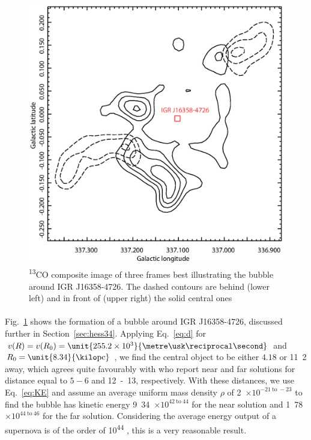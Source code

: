 \documentclass[a4paper, titlepage, oneside]{article}
\newcommand{\elem}[2]{\textsuperscript{#1}{#2}}
\newcommand{\e}[1]{\ensuremath{\times 10^{#1}}}
\newcommand{\parsec}{\mathrm{pc}}
\begin{document}
\begin{multicols}{2}
\begin{figure}[H]
  \centering
  \includegraphics[width = \columnwidth]{figures/bubble34}
  \caption{\elem{13}{C}O composite image of three frames best illustrating the bubble around IGR J16358-4726. The dashed contours are behind (lower left) and in front of (upper right) the solid central ones}
  \label{fig:bubble34}
\end{figure}

\paragraph{}
Fig.~\ref{fig:bubble34} shows the formation of a bubble around IGR J16358-4726, discussed further in Section~\ref{sec:hess34}. Applying Eq.~\ref{eq:d} for \(v(R) = v(R_0) = \unit{255.2\e{3}}{\metre\usk\reciprocal\second}\) and \(R_0 = \unit{8.34}{\kilo\parsec}\) \parencite{Reid:2014}, we find the central object to be either \(4.18\) or \unit{11.2}{\kilo\parsec} away, which agrees quite favourably with \textcite{Lutovinov:2005} who report near and far solutions for distance equal to \(5 - 6\) and \unit{12 - 13}{\kilo\parsec}, respectively. With these distances, we use Eq.~\ref{eq:KE} and assume an average uniform mass density \(\rho\) of \unit{2\e{-21 \mathrm{~to~} -23}}{\kilo\gram\usk\centi\metre\rpcubed} \parencite{Ferriere:2001} to find the bubble has kinetic energy \unit{9.34\e{42 \mathrm{~to~} 44}}{\joule} for the near solution and \unit{1.78\e{44 \mathrm{~to~} 46}}{\joule} for the far solution. Considering the average energy output of a supernova is of the order of \unit{10^{44}}{\joule} \parencite{Khokhlov:1993}, this is a very reasonable result.


\end{multicols}
\end{document}
